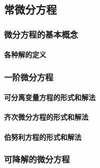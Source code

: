 \documentclass[
]{article}
\begin{document}
\hypertarget{ux5e38ux5faeux5206ux65b9ux7a0b}{%
\subsection{常微分方程}\label{ux5e38ux5faeux5206ux65b9ux7a0b}}

\hypertarget{ux5faeux5206ux65b9ux7a0bux7684ux57faux672cux6982ux5ff5}{%
\subsubsection{微分方程的基本概念}\label{ux5faeux5206ux65b9ux7a0bux7684ux57faux672cux6982ux5ff5}}

\hypertarget{ux5404ux79cdux89e3ux7684ux5b9aux4e49}{%
\paragraph{各种解的定义}\label{ux5404ux79cdux89e3ux7684ux5b9aux4e49}}

\hypertarget{ux4e00ux9636ux5faeux5206ux65b9ux7a0b}{%
\subsubsection{一阶微分方程}\label{ux4e00ux9636ux5faeux5206ux65b9ux7a0b}}

\hypertarget{ux53efux5206ux79bbux53d8ux91cfux65b9ux7a0bux7684ux5f62ux5f0fux548cux89e3ux6cd5}{%
\paragraph{可分离变量方程的形式和解法}\label{ux53efux5206ux79bbux53d8ux91cfux65b9ux7a0bux7684ux5f62ux5f0fux548cux89e3ux6cd5}}

\hypertarget{ux9f50ux6b21ux5faeux5206ux65b9ux7a0bux7684ux5f62ux5f0fux548cux89e3ux6cd5}{%
\paragraph{齐次微分方程的形式和解法}\label{ux9f50ux6b21ux5faeux5206ux65b9ux7a0bux7684ux5f62ux5f0fux548cux89e3ux6cd5}}

\hypertarget{ux4f2fux52aaux5229ux65b9ux7a0bux7684ux5f62ux5f0fux548cux89e3ux6cd5}{%
\paragraph{伯努利方程的形式和解法}\label{ux4f2fux52aaux5229ux65b9ux7a0bux7684ux5f62ux5f0fux548cux89e3ux6cd5}}

\hypertarget{ux53efux964dux89e3ux7684ux5faeux5206ux65b9ux7a0b}{%
\subsubsection{可降解的微分方程}\label{ux53efux964dux89e3ux7684ux5faeux5206ux65b9ux7a0b}}
\end{document}
